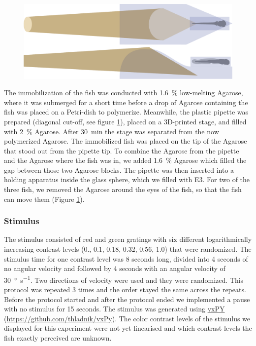 \begin{figure}
    \vspace{-0.3cm}
    \includegraphics[width=\linewidth]{figures/drawing.pdf}
    \label{fig:stage}
\end{figure}

The immobilization of the fish was conducted with \SI{1.6}{\percent} low-melting Agarose, where it was submerged for a short time before a drop of Agarose containing the fish was placed on a Petri-dish to polymerize. Meanwhile, the plastic pipette was prepared (diagonal cut-off, see figure \ref{fig:stage}), placed on a 3D-printed stage, and filled with \SI{2}{\percent} Agarose. After \SI{30}{\minute} the stage was separated from the now polymerized Agarose. The immobilized fish was placed on the tip of the Agarose that stood out from the pipette tip. To combine the Agarose from the pipette and the Agarose where the fish was in, we added \SI{1.6}{\percent} Agarose which filled the gap between those two Agarose blocks. The pipette was then inserted into a holding apparatus inside the glass sphere, which we filled with E3. For two of the three fish, we removed the Agarose around the eyes of the fish, so that the fish can move them (Figure \ref{fig:stage}). 

\subsubsection{Stimulus}

The stimulus consisted of red and green gratings with six different logarithmically increasing contrast levels (0., 0.1, 0.18, 0.32, 0.56, 1.0) that were randomized. The stimulus time for one contrast level was 8 seconds long, divided into 4 seconds of no angular velocity and followed by 4 seconds with an angular velocity of \SI{30}{\degree\per\second}. Two directions of velocity were used and they were randomized. This protocol was repeated 3 times and the order stayed the same across the repeats. Before the protocol started and after the protocol ended we implemented a pause with no stimulus for 15 seconds. The stimulus was generated using \href{https://github.com/thladnik/vxPy}{vxPY} (\href{https://github.com/thladnik/vxPy}{https://github.com/thladnik/vxPy}). The color contrast levels of the stimulus we displayed for this experiment were not yet linearised and which contrast levels the fish exactly perceived are unknown. 


